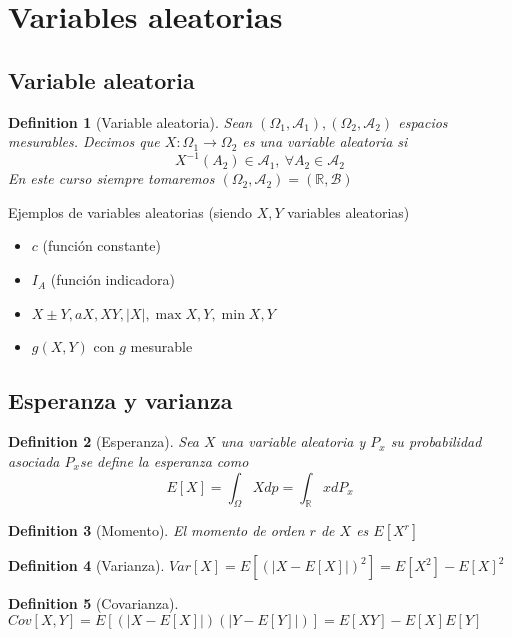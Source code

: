 \documentclass[leqno]{article}
\newtheorem*{definition}{Definition}
\begin{document}
\section{Variables aleatorias}
\subsection{Variable aleatoria}
\begin{definition}[Variable aleatoria] Sean $(\Omega _1, \mathcal{A}_1), (\Omega _2, \mathcal{A}_2)$ espacios mesurables. Decimos que $X: \Omega _1 \to  \Omega _2$ es una variable aleatoria si
  \[
  X^{-1}(A_2)\in \mathcal{A}_1, \ \forall A_2 \in \mathcal{A}_2
\] 
En este curso siempre tomaremos $(\Omega _2, \mathcal{A}_2)=(\mathbb{R}, \mathcal{B})$

\end{definition}
Ejemplos de variables aleatorias (siendo $X, Y$ variables aleatorias)
\begin{itemize}[topsep=-6pt, itemsep=0pt]
  \item $c$ (función constante)
  \item $I_A$ (función indicadora)
  \item $X \pm Y, aX, XY, |X|, \max{X, Y}, \min{X, Y}$ 
  \item $g(X, Y)$ con  $g$ mesurable
\end{itemize}


  \subsection{Esperanza y varianza}

\begin{definition}[Esperanza] Sea $X$ una variable aleatoria y  $P_x$ su probabilidad asociada $P_x$se define la esperanza como
   \[
E[X]= \int_\Omega Xdp = \int_{\mathbb{R}} xdP_x  
  \] 
\end{definition}

\begin{definition}[Momento] El momento de orden $r$ de  $X$ es  $E[X^r]$
\end{definition}

\begin{definition}[Varianza] $Var[X] = E[(|X-E[X]|)^2] = E[X^2]-E[X]^2 $ 
\end{definition}

\begin{definition}[Covarianza] $Cov[X, Y] = E[(|X-E[X]|)(|Y-E[Y]|)] = E[XY]-E[X]E[Y] $ 
\end{definition}
\end{document}
